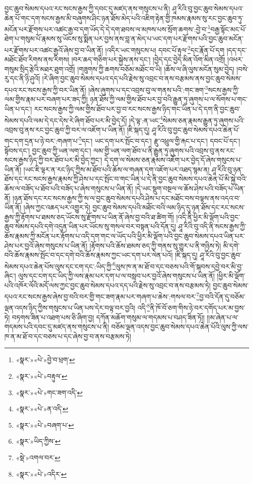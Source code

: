 བྱང་ཆུབ་སེམས་དཔའ་རང་སངས་རྒྱས་ཀྱི་དབང་དུ་མཛད་ནས་གསུངས་པ་ནི། ཤཱ་རིའི་བུ་བྱང་ཆུབ་སེམས་དཔའ་ཆེན་པོ་གང་དག་སངས་རྒྱས་མི་བཞུགས་ཤིང་ཉན་ཐོས་མེད་པའི་འཇིག་རྟེན་གྱི་ཁམས་རྣམས་སུ་རང་བྱང་ཆུབ་ཏུ་མངོན་པར་རྫོགས་པར་འཚང་རྒྱ་བ་དག་ཡོད་དེ་དེ་དག་ཐབས་ལ་མཁས་པས་སྲོག་ཆགས་:བྱེ་བ་\footnote{«སྣར་»«པེ་»བྱེ་བ་ཕྲག་}བརྒྱ་སྟོང་མང་པོ་ཐེག་པ་གསུམ་པོ་རྣམས་སུ་ཡོངས་སུ་སྨིན་པར་བྱས་ནས་བླ་ན་མེད་པ་ཡང་དག་པར་རྫོགས་པའི་བྱང་ཆུབ་མངོན་པར་རྫོགས་པར་འཚང་རྒྱའོ་ཞེས་བྱ་བ་ཡིན་ནོ། །འདིར་ཡང་གསུངས་པ། དབང་པོ་རྟུལ་\footnote{«སྣར་»«པེ་»བརྟུལ་}དང་རྣོན་པོ་དག །དད་དང་མཐོང་ཐོབ་རིགས་ནས་རིགས། །བར་ཆད་གཅིག་པར་སྐྱེས་ནས་དང་། །བྱེད་དང་བྱེད་མིན་འོག་མིན་འགྲོ། །འཕར་གསུམ་སྲིད་རྩེའི་མཐར་ཐུག་འགྲོ། །གཟུགས་ཀྱི་ཆགས་བཅོམ་མཐོང་བ་ཡི། །ཆོས་ལ་ཞི་ལུས་མངོན་སུམ་བྱེད། །བསེ་རུ་དང་ནི་ཉི་ཤུའོ། །རེ་ཞིག་བྱང་ཆུབ་སེམས་དཔའ་དད་པའི་རྗེས་སུ་འབྲང་བ་ནས་བརྩམས་ནས་བྱང་ཆུབ་སེམས་དཔའ་རང་སངས་རྒྱས་ཀྱི་བར་ཡིན་ནོ། །ཞེས་ཞུགས་པ་དང་འབྲས་བུ་ལ་གནས་པའི་:གང་ཟག་\footnote{«སྣར་»«པེ་»གང་ཟག་འདི་}སངས་རྒྱས་ཀྱི་ལམ་གྱིས་རྣམ་པར་བཞག་པར་ཟད་ཀྱི། ཉན་ཐོས་ཀྱི་ལམ་གྱིས་ཐོབ་པར་བྱ་བའི་རྒྱུན་ཏུ་ཞུགས་པ་ལ་སོགས་པ་གང་ཡིན་པ་དང་། རང་སངས་རྒྱས་ཀྱི་ལམ་གྱིས་ཐོབ་པར་བྱ་བ་རང་སངས་རྒྱས་ཉིད་གང་ཡིན་པ་དེ་དག་ནི་བྱང་ཆུབ་སེམས་དཔའི་ལམ་དེ་དང་དེས་རེ་ཞིག་ཐོབ་པར་མི་བྱེད་དོ། །དེ་ལྟ་:ན་ཡང་\footnote{«སྣར་»«པེ་»ན་འདི་}སེམས་ཅན་རྣམས་རྒྱུན་ཏུ་ཞུགས་པའི་འབྲས་བུ་ནས་རང་བྱང་ཆུབ་ཀྱི་བར་ལ་འཇོག་པ་ཡིན་ནོ། །ཇི་སྐད་དུ། ཤཱ་རིའི་བུ་བྱང་ཆུབ་སེམས་དཔའ་ཆེན་པོ་གང་དག་དྲན་པ་ཉེ་བར་:གཞག་པ་\footnote{«སྣར་»«པེ་»བཞག་པ་}དང་། ཡང་དག་པར་སྤོང་བ་དང་། རྫུ་འཕྲུལ་གྱི་རྐང་པ་དང་། དབང་པོ་དང་། སྟོབས་དང་། བྱང་ཆུབ་ཀྱི་ཡན་ལག་དང་། ལམ་གྱི་ཡན་ལག་ཐོབ་པ་ནི་རྒྱུན་ཏུ་ཞུགས་པའི་འབྲས་བུ་ནས་རང་སངས་རྒྱས་ཉིད་ཀྱི་བར་ཐོབ་པར་མི་བྱེད་ཀྱང་། དེ་དག་ལ་སེམས་ཅན་རྣམས་འཇོག་པར་བྱེད་དོ་ཞེས་གསུངས་པ་ཡིན་ནོ། །ཡང་ཇི་ལྟར་ན་རང་ཉིད་ཀྱིས་མ་ཐོབ་པའི་ཆོས་ལ་གཞན་དག་འཇོག་པར་འཐད་སྙམ་ན། ཤཱ་རིའི་བུ་ཉན་ཐོས་དང་རང་སངས་རྒྱས་རྣམས་ཀྱི་ཤེས་པ་དང་སྤོང་བ་གང་ཡིན་པ་དེ་ནི་བྱང་ཆུབ་སེམས་དཔའ་ཆེན་པོ་མི་སྐྱེ་བའི་ཆོས་ལ་བཟོད་པ་ཐོབ་པའི་བཟོད་པ་ཞེས་གསུངས་པ་ཡིན་ནོ། །དེ་ཡང་སྡུག་བསྔལ་ལ་ཆོས་ཤེས་པའི་བཟོད་པ་ཡིན་ནོ། །ཉན་ཐོས་དང་རང་སངས་རྒྱས་ཀྱི་ས་ལ་བྱང་ཆུབ་སེམས་དཔའི་ཤེས་པ་དང་མཐོང་བས་བལྟས་ནས་འདའ་བ་ཡིན་ནོ། །ཞེས་ཀྱང་འཆད་པར་འགྱུར་ཏེ། བྱང་ཆུབ་སེམས་དཔའི་མཐོང་བའི་ལམ་ཉིད་དུ་ཉན་ཐོས་དང་རང་སངས་རྒྱས་ཀྱི་རྟོགས་པ་ཐམས་ཅད་ཡོངས་སུ་རྫོགས་པ་ཡིན་ནོ་ཞེས་བྱ་བའི་ཐ་ཚིག་གོ། །འདི་ནི་ཕྱིར་མི་ལྡོག་པའི་བྱང་ཆུབ་སེམས་དཔའི་དགེ་འདུན་ཡིན་པར་ཡོངས་སུ་གསལ་བར་བསྟན་པའི་དོན་དུ། ཤཱ་རིའི་བུ་འདི་ནི་སངས་རྒྱས་ཀྱི་ཆོས་རྣམས་ཀྱི་མངོན་པར་རྟོགས་པ་འདི་དག་གང་ལ་ཡོད་པའི་ཕྱིར་མི་ལྡོག་པའི་བྱང་ཆུབ་སེམས་དཔའ་ཡིན་པར་ཤེས་པར་བྱའོ་ཞེས་གསུངས་པ་ཡིན་ནོ། །རྟོགས་པའི་ཆོས་ཐམས་ཅད་ཀྱི་གནས་སུ་གྱུར་པ་ནི་གཉིས་ཏེ། མི་དགེ་བའི་ཆོས་རྣམས་སྤོང་བ་དང་དགེ་བའི་ཆོས་རྣམས་ཀྱང་ཡང་དག་པར་ལེན་པའོ། །ཇི་སྐད་དུ། ཤཱ་རིའི་བུ་བྱང་ཆུབ་སེམས་དཔའ་ཆེན་པོས་ལུས་དང་ངག་དང་:ཡིད་ཀྱི་\footnote{«སྣར་»ཡིད་ཀྱིས་}ལུས་ཁ་ན་མ་ཐོ་བ་དང་བཅས་པའི་གོ་སྐབས་དབྱེ་བར་མི་བྱ་ཞིང་། ལུས་དང་ངག་དང་ཡིད་ཀྱི་ལས་རྣམ་པར་དག་པ་ལ་བསླབ་པར་བྱའོ་ཞེས་གསུངས་པ་ཡིན་ནོ། །ཕྱིར་མི་ལྡོག་པའི་འཁོར་ལོའི་མདོ་ལས་ཀྱང་བྱང་ཆུབ་སེམས་དཔའ་དད་པའི་རྗེས་སུ་འབྲང་བ་ནས་བརྩམས་ཏེ། བྱང་ཆུབ་སེམས་དཔའ་རང་སངས་རྒྱས་ཞེས་བྱ་བའི་བར་གྱི་གང་ཟག་རྣམ་པར་གཞག་པ་ཆེས་:གསལ་བར་\footnote{«སྡེ་»འགལ་བར་}བྱ་བའི་དོན་དུ་བཅོམ་ལྡན་འདས་ཉིད་ཀྱིས་གསུངས་པ་ཡིན་པས་དེར་བལྟ་བར་བྱའི། འདི་\footnote{«སྣར་»«པེ་»འདིར་}ནི་ཁོ་བོ་ཅག་གིས་ཉེ་བར་དགོད་པར་མ་བྱས་ཏེ། བཏགས་ཟིན་པ་འཐག་པས་ཅི་ཞིག་བྱ། དཀོན་མཆོག་གསུམ་ལ་གདམས་པ་བཤད་ཟིན་ཏོ།། །།མ་ཞེན་པ་ལ་གདམས་པའི་དབང་དུ་མཛད་ནས་གསུངས་པ་ནི། བཅོམ་ལྡན་འདས་བྱང་ཆུབ་སེམས་དཔའ་ཆེན་པོའི་ལུས་ཀྱི་ལས་ཁ་ན་མ་ཐོ་བ་དང་བཅས་པ་དང་ཞེས་བྱ་བ་ནས་བརྩམས་ཏེ། 